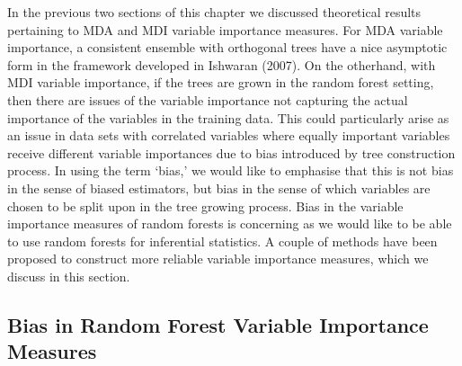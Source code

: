 \documentclass[12pt,twoside]{reedthesis}
\theoremstyle{definition}
\theoremstyle{definition}
\theoremstyle{definition}
\theoremstyle{remark}
\begin{document}
In the previous two sections of this chapter we discussed theoretical
results pertaining to MDA and MDI variable importance measures. For MDA
variable importance, a consistent ensemble with orthogonal trees have a
nice asymptotic form in the framework developed in Ishwaran (2007). On
the otherhand, with MDI variable importance, if the trees are grown in
the random forest setting, then there are issues of the variable
importance not capturing the actual importance of the variables in the
training data. This could particularly arise as an issue in data sets
with correlated variables where equally important variables receive
different variable importances due to bias introduced by tree
construction process. In using the term `bias,' we would like to
emphasise that this is not bias in the sense of biased estimators, but
bias in the sense of which variables are chosen to be split upon in the
tree growing process. Bias in the variable importance measures of random
forests is concerning as we would like to be able to use random forests
for inferential statistics. A couple of methods have been proposed to
construct more reliable variable importance measures, which we discuss
in this section. \par

\subsection{Bias in Random Forest Variable Importance
Measures}\label{bias-in-random-forest-variable-importance-measures}
\end{document}
